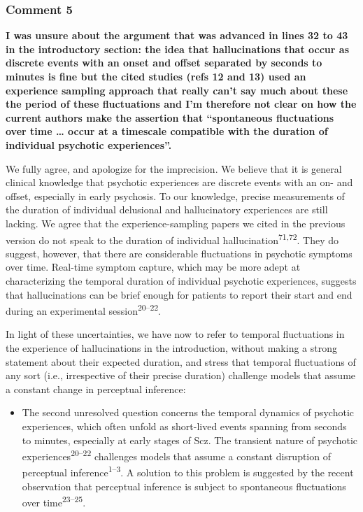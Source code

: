 \documentclass[
]{article}
\providecommand{\tightlist}{%
  \setlength{\itemsep}{0pt}\setlength{\parskip}{0pt}}
\begin{document}
\subsubsection{Comment 5}\label{comment-5-1}

\textbf{I was unsure about the argument that was advanced in lines 32 to
43 in the introductory section: the idea that hallucinations that occur
as discrete events with an onset and offset separated by seconds to
minutes is fine but the cited studies (refs 12 and 13) used an
experience sampling approach that really can't say much about these the
period of these fluctuations and I'm therefore not clear on how the
current authors make the assertion that ``spontaneous fluctuations over
time \ldots{} occur at a timescale compatible with the duration of
individual psychotic experiences''.}

We fully agree, and apologize for the imprecision. We believe that it is
general clinical knowledge that psychotic experiences are discrete
events with an on- and offset, especially in early psychosis. To our
knowledge, precise measurements of the duration of individual delusional
and hallucinatory experiences are still lacking. We agree that the
experience-sampling papers we cited in the previous version do not speak
to the duration of individual hallucination\textsuperscript{71,72}. They
do suggest, however, that there are considerable fluctuations in
psychotic symptoms over time. Real-time symptom capture, which may be
more adept at characterizing the temporal duration of individual
psychotic experiences, suggests that hallucinations can be brief enough
for patients to report their start and end during an experimental
session\textsuperscript{20--22}.

In light of these uncertainties, we have now to refer to temporal
fluctuations in the experience of hallucinations in the introduction,
without making a strong statement about their expected duration, and
stress that temporal fluctuations of any sort (i.e., irrespective of
their precise duration) challenge models that assume a constant change
in perceptual inference:

\begin{itemize}
\tightlist
\item
  The second unresolved question concerns the temporal dynamics of
  psychotic experiences, which often unfold as short-lived events
  spanning from seconds to minutes, especially at early stages of Scz.
  The transient nature of psychotic experiences\textsuperscript{20--22}
  challenges models that assume a constant disruption of perceptual
  inference\textsuperscript{1--3}. A solution to this problem is
  suggested by the recent observation that perceptual inference is
  subject to spontaneous fluctuations over time\textsuperscript{23--25}.
\end{itemize}
\end{document}

